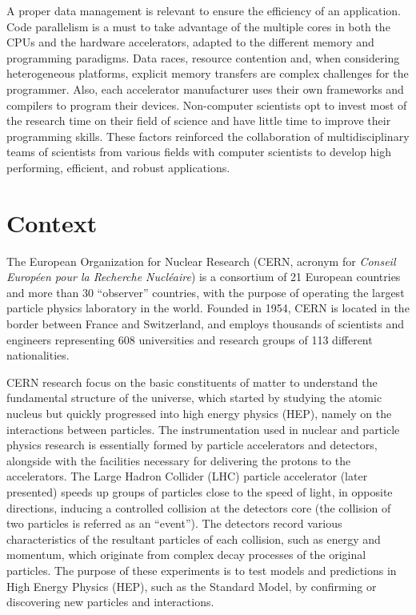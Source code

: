 A proper data management is relevant to ensure the efficiency of an application. Code parallelism is a must to take advantage of the multiple cores in both the CPUs and the hardware accelerators, adapted to the different memory and programming paradigms. Data races, resource contention and, when considering heterogeneous platforms, explicit memory transfers are complex challenges for the programmer. Also, each accelerator manufacturer uses their own frameworks and compilers to program their devices. Non-computer scientists opt to invest most of the research time on their field of science and have little time to improve their programming skills. These factors reinforced the collaboration of multidisciplinary teams of scientists from various fields with computer scientists to develop high performing, efficient, and robust applications.

\section{Context}
\label{context}

The European Organization for Nuclear Research \cite{CERN} (CERN, acronym for \textit{Conseil Européen pour la Recherche Nucléaire}) is a consortium of 21 European countries and more than 30 ``observer'' countries, with the purpose of operating the largest particle physics laboratory in the world. Founded in 1954, CERN is located in the border between France and Switzerland, and employs thousands of scientists and engineers representing 608 universities and research groups of 113 different nationalities.

CERN research focus on the basic constituents of matter to understand the fundamental structure of the universe, which started by studying the atomic nucleus but quickly progressed into high energy physics (HEP), namely on the interactions between particles. The instrumentation used in nuclear and particle physics research is essentially formed by particle accelerators and detectors, alongside with the facilities necessary for delivering the protons to the accelerators. The Large Hadron Collider (LHC) particle accelerator (later presented) speeds up groups of particles close to the speed of light, in opposite directions, inducing a controlled collision at the detectors core (the collision of two particles is referred as an ``event''). The detectors record various characteristics of the resultant particles of each collision, such as energy and momentum, which originate from complex decay processes of the original particles. The purpose of these experiments is to test models and predictions in High Energy Physics (HEP), such as the Standard Model, by confirming or discovering new particles and interactions.

